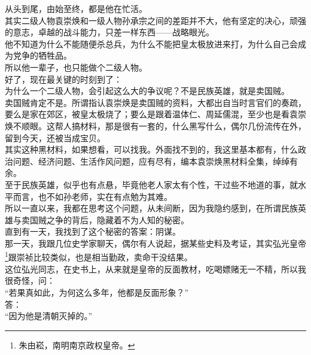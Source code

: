 \begin{multicols}{\theparacolNo}
从头到尾，由始至终，都是他在忙活。\\

其实二级人物袁崇焕和一级人物孙承宗之间的差距并不大，他有坚定的决心，顽强的意志，卓越的战斗能力，只差一样东西——战略眼光。\\

他不知道为什么不能随便杀总兵，为什么不能把皇太极放进来打，为什么自己会成为党争的牺牲品。\\

所以他一辈子，也只能做个二级人物。\\

好了，现在最关键的时刻到了：\\

为什么一个二级人物，会引起这么大的争议呢？不是民族英雄，就是卖国贼。\\

卖国贼肯定不是。所谓指认袁崇焕是卖国贼的资料，大都出自当时言官们的奏疏，要么是家在郊区，被皇太极烧了；要么是跟着温体仁、周延儒混，至少也是看袁崇焕不顺眼。这帮人搞材料，那是很有一套的，什么黑写什么，偶尔几份流传在外，留到今天，还被当成宝贝。\\

其实这种黑材料，如果想看，可以找我。外面找不到的，我这里基本都有，什么政治问题、经济问题、生活作风问题，应有尽有，编本袁崇焕黑材料全集，绰绰有余。\\

至于民族英雄，似乎也有点悬，毕竟他老人家太有个性，干过些不地道的事，就水平而言，也不如孙老师，实在有点勉为其难。\\

所以一直以来，我都在思考这个问题，从未间断，因为我隐约感到，在所谓民族英雄与卖国贼之争的背后，隐藏着不为人知的秘密。\\

直到有一天，我找到了这个秘密的答案：阴谋。\\

那一天，我跟几位史学家聊天，偶尔有人说起，据某些史料及考证，其实弘光皇帝\footnote{朱由崧，南明南京政权皇帝。}跟崇祯比较类似，也是相当勤政，卖命干没结果。\\

这位弘光同志，在史书上，从来就是皇帝的反面教材，吃喝嫖赌无一不精，所以我很奇怪，问：\\

“若果真如此，为何这么多年，他都是反面形象？”\\

答：\\

“因为他是清朝灭掉的。”\\


\end{multicols}
